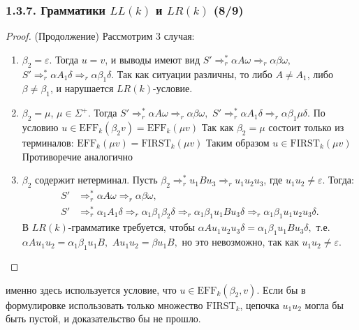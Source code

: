 \documentclass[mathserif,12pt,aspectratio=169]{beamer}
\begin{document}
\begin{frame}
\frametitle{1.3.7. Грамматики $LL(k)$ и $LR(k)$ (8/9)}
\begin{proof} (Продолжение)
Рассмотрим 3 случая:
\begin{enumerate}
    \item $\beta_2 = \varepsilon$.
    Тогда $u=v$, и выводы имеют вид
    \(
    S' \Rightarrow_r^* \alpha A \omega \Rightarrow_r \alpha \beta \omega,\)
    \(S' \Rightarrow_r^* \alpha A_1 \delta \Rightarrow_r \alpha \beta_1 \delta.
    \)
    Так как ситуации различны, то либо $A \ne A_1$, либо $\beta \ne \beta_1$,
    и нарушается $LR(k)$-условие.
\item $\beta_2 = \mu$, $\mu \in \Sigma^+$.
Тогда \(
S' \Rightarrow_r^* \alpha A \omega \Rightarrow_r \alpha \beta \omega,\)
\(S' \Rightarrow_r^* \alpha A_1 \delta \Rightarrow_r \alpha \beta_1 \mu \delta.
\)
По условию $u \in \mathrm{EFF}_k(\beta_2 v) = \mathrm{EFF}_k(\mu v)$
Так как $\beta_2 = \mu$ состоит только из терминалов:
$\mathrm{EFF}_k(\mu v) = \mathrm{FIRST}_k(\mu v)$
Таким образом  $u \in \mathrm{FIRST}_k(\mu v)$
Противоречие аналогично
\item $\beta_2$ содержит нетерминал.
Пусть $\beta_2 \Rightarrow_r^* u_1 B u_3 \Rightarrow_r u_1 u_2 u_3$, где $u_1 u_2 \ne \varepsilon$.
Тогда:
\[
\begin{aligned}
S' &\Rightarrow_r^* \alpha A \omega \Rightarrow_r \alpha \beta \omega,\\
S' &\Rightarrow_r^* \alpha_1 A_1 \delta \Rightarrow_r \alpha_1 \beta_1 \beta_2 \delta 
     \Rightarrow_r \alpha_1 \beta_1 u_1 B u_3 \delta \Rightarrow_r \alpha_1 \beta_1 u_1 u_2 u_3 \delta.
\end{aligned}
\]
В $LR(k)$-грамматике требуется, чтобы
\(
\alpha A u_1 u_2 u_3 \delta = \alpha_1 \beta_1 u_1 B u_3 \delta,
\) т.е. \\
\(
\alpha A u_1 u_2 = \alpha_1 \beta_1 u_1 B,
\)
\(
A u_1 u_2 = \beta u_1 B,
\)
но это невозможно, так как $u_1 u_2 \ne \varepsilon$.
\end{enumerate}

\vspace{-12pt}
\end{proof}

\begin{remark}
именно здесь используется условие, что \(u \in \mathrm{EFF}_k(\beta_2, v).\)
Если бы в формулировке использовать только множество $\mathrm{FIRST}_k$,
цепочка $u_1 u_2$ могла бы быть пустой, и доказательство бы не прошло.
\end{remark}

\end{frame}
\end{document}
